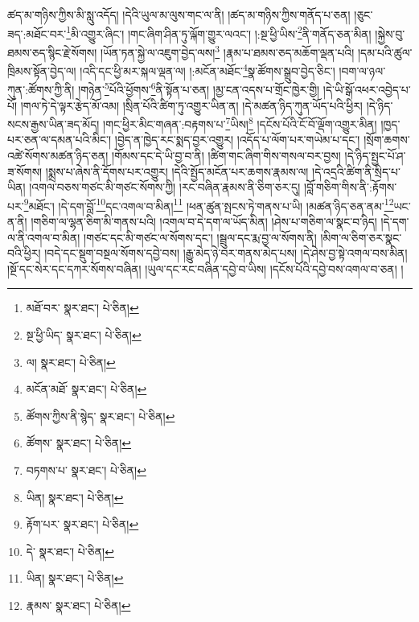 ཚད་མ་གཉིས་ཀྱིས་མི་སླུ་འདོད། །དེའི་ཡུལ་མ་ལུས་གང་ལ་ནི། །ཚད་མ་གཉིས་ཀྱིས་གནོད་པ་ཅན། །ཅུང་ཟད་:མཐོང་བར་\footnote{མཐོ་བར་  སྣར་ཐང་།  པེ་ཅིན། }མི་འགྱུར་ཞིང་། །གང་ཞིག་ཤིན་ཏུ་ལྐོག་གྱུར་ལའང་། །:སྔ་ཕྱི་ཡིས་\footnote{སྔ་ཕྱི་ཡིད་  སྣར་ཐང་།  པེ་ཅིན། }ནི་གནོད་ཅན་མིན། །སྐྱེས་བུ་ཐམས་ཅད་སྙིང་རྗེ་སོགས། །ཡོན་ཏན་སྐྱེ་ལ་འཇུག་བྱེད་ལས།\footnote{ལ།  སྣར་ཐང་།  པེ་ཅིན། } །རྣམ་པ་ཐམས་ཅད་མཆོག་ལྡན་པའི། །དམ་པའི་ཚུལ་ཁྲིམས་སྟོན་བྱེད་ལ། །འདི་དང་ཕྱི་མར་སྐལ་ལྡན་ལ། །:མངོན་མཐོང་\footnote{མངོན་མཐོ་  སྣར་ཐང་།  པེ་ཅིན། }སྣ་ཚོགས་སྒྲུབ་བྱེད་ཅིང་། །བག་ལ་ཉལ་ཀུན་:ཚོགས་ཀྱི་ནི། །གཉེན་\footnote{ཚོགས་ཀྱིས་ནི་སྙེད་  སྣར་ཐང་།  པེ་ཅིན། }པོའི་ཕྱོགས་\footnote{ཚོགས་  སྣར་ཐང་།  པེ་ཅིན། }ནི་སྟོན་པ་ཅན། །མྱ་ངན་འདས་པ་གྲོང་ཁྱེར་གྱི། །དེ་ཡི་སྒོ་འཕར་འབྱེད་པ་པོ། །གལ་ཏེ་དེ་ལྟར་རྩེད་མོ་འམ། །སྲིན་པོའི་ཚིག་ཏུ་འགྱུར་ཡིན་ན། །དེ་མཚན་ཉིད་ཀུན་ཡོད་པའི་ཕྱིར། །དེ་ཉིད་སངས་རྒྱས་ཡིན་ཟད་མོད། །གང་ཕྱིར་མིང་གཞན་:བརྟགས་པ་\footnote{བཏགས་པ་  སྣར་ཐང་།  པེ་ཅིན། }ཡིས།\footnote{ཡིན།  སྣར་ཐང་།  པེ་ཅིན། } །དངོས་པོའི་ངོ་བོ་ལྡོག་འགྱུར་མིན། །ཁྱད་པར་ཅན་ལ་དམན་པའི་མིང་། །བྱེད་ན་ཁྱེད་རང་སྨད་བྱར་འགྱུར། །འདོད་པ་ལོག་པར་གཡེམ་པ་དང་། །སྲོག་ཆགས་འཚེ་སོགས་མཚན་ཉིད་ཅན། །གོམས་དང་དེ་ཡི་བྱ་བ་ནི། །ཚིག་གང་ཞིག་གིས་གསལ་བར་བྱས། །དེ་ཉིད་སྤྱང་པོ་ཤ་ཟ་སོགས། །སྨྲས་པ་ཞེས་ནི་དོགས་པར་འགྱུར། །དེའི་སྤྱོད་མངོན་པར་ཆགས་རྣམས་ལ། །དེ་འདྲའི་ཚིག་ནི་སྲིད་པ་ཡིན། །འགལ་བཅས་གཙང་མི་གཙང་སོགས་ཀྱི། །རང་བཞིན་རྣམས་ནི་ཅིག་ཅར་དུ། །བློ་གཅིག་གིས་ནི་:རྟོགས་པར་\footnote{རྟོག་པར་  སྣར་ཐང་།  པེ་ཅིན། }མཐོང་། །དེ་དག་བློ་\footnote{དེ་  སྣར་ཐང་།  པེ་ཅིན། }དང་འགལ་བ་མིན།\footnote{ཡིན།  སྣར་ཐང་།  པེ་ཅིན། } །ཕན་ཚུན་སྤངས་ཏེ་གནས་པ་ཡི། །མཚན་ཉིད་ཅན་ནམ་\footnote{རྣམས་  སྣར་ཐང་།  པེ་ཅིན། }ཡང་ན་ནི། །གཅིག་ལ་ལྷན་ཅིག་མི་གནས་པའི། །འགལ་བ་དེ་དག་ལ་ཡོད་མིན། །ཤེས་པ་གཅིག་ལ་སྣང་བ་ཉིད། །དེ་དག་ལ་ནི་འགལ་བ་མིན། །གཙང་དང་མི་གཙང་ལ་སོགས་དང་། །སྦྲུལ་དང་རྨ་བྱ་ལ་སོགས་ནི། །མིག་ལ་ཅིག་ཅར་སྣང་བའི་ཕྱིར། །བདེ་དང་སྡུག་བསྔལ་སོགས་དབྱེ་བས། །རྒྱུ་མེད་ཉེ་བར་གནས་མེད་པས། །དེ་ཤེས་བྱ་སྟེ་འགལ་བས་མིན། །སྔོ་དང་སེར་དང་དཀར་སོགས་བཞིན། །ཡུལ་དང་རང་བཞིན་དབྱེ་བ་ཡིས། །དངོས་པོའི་དབྱེ་བས་འགལ་བ་ཅན། །
